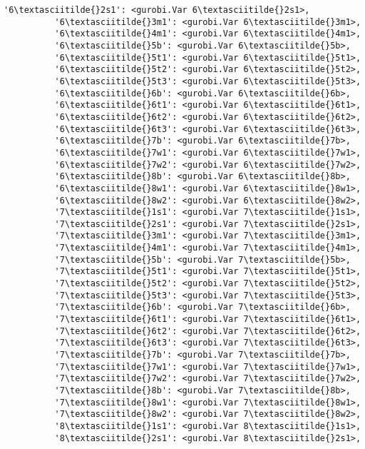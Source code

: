 \documentclass[11pt]{article}
\begin{document}
\begin{Verbatim}[commandchars=\\\{\}]
          '6\textasciitilde{}2s1': <gurobi.Var 6\textasciitilde{}2s1>,
          '6\textasciitilde{}3m1': <gurobi.Var 6\textasciitilde{}3m1>,
          '6\textasciitilde{}4m1': <gurobi.Var 6\textasciitilde{}4m1>,
          '6\textasciitilde{}5b': <gurobi.Var 6\textasciitilde{}5b>,
          '6\textasciitilde{}5t1': <gurobi.Var 6\textasciitilde{}5t1>,
          '6\textasciitilde{}5t2': <gurobi.Var 6\textasciitilde{}5t2>,
          '6\textasciitilde{}5t3': <gurobi.Var 6\textasciitilde{}5t3>,
          '6\textasciitilde{}6b': <gurobi.Var 6\textasciitilde{}6b>,
          '6\textasciitilde{}6t1': <gurobi.Var 6\textasciitilde{}6t1>,
          '6\textasciitilde{}6t2': <gurobi.Var 6\textasciitilde{}6t2>,
          '6\textasciitilde{}6t3': <gurobi.Var 6\textasciitilde{}6t3>,
          '6\textasciitilde{}7b': <gurobi.Var 6\textasciitilde{}7b>,
          '6\textasciitilde{}7w1': <gurobi.Var 6\textasciitilde{}7w1>,
          '6\textasciitilde{}7w2': <gurobi.Var 6\textasciitilde{}7w2>,
          '6\textasciitilde{}8b': <gurobi.Var 6\textasciitilde{}8b>,
          '6\textasciitilde{}8w1': <gurobi.Var 6\textasciitilde{}8w1>,
          '6\textasciitilde{}8w2': <gurobi.Var 6\textasciitilde{}8w2>,
          '7\textasciitilde{}1s1': <gurobi.Var 7\textasciitilde{}1s1>,
          '7\textasciitilde{}2s1': <gurobi.Var 7\textasciitilde{}2s1>,
          '7\textasciitilde{}3m1': <gurobi.Var 7\textasciitilde{}3m1>,
          '7\textasciitilde{}4m1': <gurobi.Var 7\textasciitilde{}4m1>,
          '7\textasciitilde{}5b': <gurobi.Var 7\textasciitilde{}5b>,
          '7\textasciitilde{}5t1': <gurobi.Var 7\textasciitilde{}5t1>,
          '7\textasciitilde{}5t2': <gurobi.Var 7\textasciitilde{}5t2>,
          '7\textasciitilde{}5t3': <gurobi.Var 7\textasciitilde{}5t3>,
          '7\textasciitilde{}6b': <gurobi.Var 7\textasciitilde{}6b>,
          '7\textasciitilde{}6t1': <gurobi.Var 7\textasciitilde{}6t1>,
          '7\textasciitilde{}6t2': <gurobi.Var 7\textasciitilde{}6t2>,
          '7\textasciitilde{}6t3': <gurobi.Var 7\textasciitilde{}6t3>,
          '7\textasciitilde{}7b': <gurobi.Var 7\textasciitilde{}7b>,
          '7\textasciitilde{}7w1': <gurobi.Var 7\textasciitilde{}7w1>,
          '7\textasciitilde{}7w2': <gurobi.Var 7\textasciitilde{}7w2>,
          '7\textasciitilde{}8b': <gurobi.Var 7\textasciitilde{}8b>,
          '7\textasciitilde{}8w1': <gurobi.Var 7\textasciitilde{}8w1>,
          '7\textasciitilde{}8w2': <gurobi.Var 7\textasciitilde{}8w2>,
          '8\textasciitilde{}1s1': <gurobi.Var 8\textasciitilde{}1s1>,
          '8\textasciitilde{}2s1': <gurobi.Var 8\textasciitilde{}2s1>,

\end{Verbatim}
\end{document}
